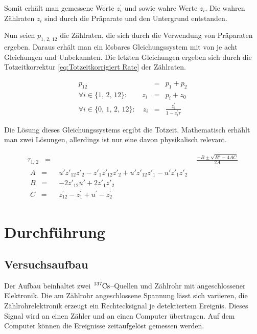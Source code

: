 \documentclass[12pt,a4paper]{scrartcl}
\numberwithin{equation}{section} %
\newcommand{\eqspaced}{\ensuremath{\;\;=\;\;}} %
\begin{document}
Somit erhält man gemessene Werte $z^\prime_i$ und sowie wahre Werte $z_i$. Die wahren Zählraten $z_i$ sind durch die Präparate und den Untergrund entstanden.

Nun seien $p_{1,\,2,\,12}$ die Zählraten, die sich durch die Verwendung von Präparaten ergeben. Daraus erhält man ein lösbares Gleichungssystem mit von je acht Gleichungen und Unbekannten.  Die letzten Gleichungen ergeben sich durch die Totzeitkorrektur \eqref{eq:Totzeitkorrigiert Rate} der Zählraten.

\begin{eqnarray}
	p_{12} &=& p_1 + p_2 \\
	\forall i\in\{1,\,2,\,12\}:\qquad
		z_i &=& p_i + z_0 \\
	\forall i\in\{0,\,1,\,2,\,12\}:\quad
		z_i &=& \frac{z^\prime_i}{1-z^\prime_i \tau}
\end{eqnarray}

\noindent
Die Lösung dieses Gleichungssystems ergibt die Totzeit. Mathematisch erhählt man zwei Lösungen, allerdings ist nur eine davon physikalisch relevant.

\begin{align}
	\tau _{1,\,2} \eqspaced& \frac{-B \pm \sqrt{B^2 - 4AC}}{2A} \label{eq:Totzeit} \\
	\begin{split}
		A \eqspaced& u'z'_{12}z'_2 - z'_1z'_12z'_2 + u'z'_{12}z'_1 - u'z'_1z'_2 \\
		B \eqspaced& -2z'_{12}u' + 2z'_1z'_2 \\
		C \eqspaced& z^\prime _{12} - z^\prime _1 + u^\prime  - z^\prime _2
	\end{split}
\end{align}

\clearpage
\hypertarget{durchfuxfchrung}{%
\section{Durchführung}\label{durchfuxfchrung}}
\subsection{Versuchsaufbau}
Der Aufbau beinhaltet zwei $\ce{^{137}Cs}$--Quellen und Zählrohr mit angeschlossener Elektronik. Die am Zählrohr angeschlossene Spannung lässt sich variieren, die Zählrohrelektronik erzeugt ein Rechtecksignal je detektiertem Ereignis. Dieses Signal wird an einen Zähler und an einen Computer übertragen. Auf dem Computer können die Ereignisse zeitaufgelöst gemessen werden.
\end{document}
